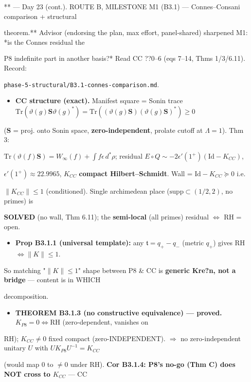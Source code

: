 \documentclass[10pt]{article}
\begin{document}
** --- Day 23 (cont.). ROUTE B, MILESTONE M1 (B3.1) --- Connes--Consani comparison + structural\par
theorem.** Advisor (endorsing the plan, max effort, panel-shared) sharpened M1: *is the Connes residual the\par
P8 indefinite part in another basis?* Read CC ??0--6 (eqs 7--14, Thms 1/3/6.11). Record:\par
\texttt{phase-5-structural/B3.1-connes-comparison.md}.\par
\begin{itemize}
\item \textbf{CC structure (exact).} Manifest square = Sonin trace $\mathrm{Tr}(\vartheta(g)\mathbf S\vartheta(g)^*)=\mathrm{Tr}((\vartheta(g)\mathbf S)(\vartheta(g)\mathbf S)^*)\ge0$
\end{itemize}
  ($\mathbf S$ = proj. onto Sonin space, \textbf{zero-independent}, prolate cutoff at $\Lambda=1$). Thm 3:\par
  $\mathrm{Tr}(\vartheta(f)\mathbf S)=W_\infty(f)+\int f\epsilon\,d^*\rho$; residual $E\circ Q\sim-2\epsilon'(1^+)(\mathrm{Id}-K_{CC})$,\par
  $\epsilon'(1^+)\approx22.9965$, $K_{CC}$ \textbf{compact Hilbert--Schmidt}. Wall = $\mathrm{Id}-K_{CC}\succeq0$ i.e.\par
  $\|K_{CC}\|\le1$ (conditioned). Single archimedean place ($\mathrm{supp}\subset(1/2,2)$, no primes) is\par
  \textbf{SOLVED} (no wall, Thm 6.11); the \textbf{semi-local} (all primes) residual $\iff$ RH = open.\par
\begin{itemize}
\item \textbf{Prop B3.1.1 (universal template):} any $\mathfrak t=q_+-q_-$ (metric $q_+$) gives RH$\iff\|K\|\le1$.
\end{itemize}
  So matching "$\|K\|\le1$" shape between P8 \& CC is \textbf{generic Kre?n, not a bridge} --- content is in WHICH\par
  decomposition.\par
\begin{itemize}
\item \textbf{THEOREM B3.1.3 (no constructive equivalence) --- proved.} $K_{P8}=0\iff$RH (zero-dependent, vanishes on
\end{itemize}
  RH); $K_{CC}\ne0$ fixed compact (zero-INDEPENDENT). \ensuremath{\Rightarrow} no zero-independent unitary $U$ with $UK_{P8}U^{-1}=K_{CC}$\par
  (would map $0$ to $\ne0$ under RH). \textbf{Cor B3.1.4: P8's no-go (Thm C) does NOT cross to $K_{CC}$} --- CC\par
\end{document}
